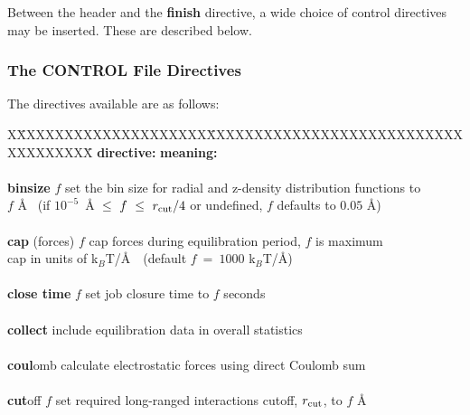 Between the header and the {\bf finish} directive, a wide choice
of control directives may be inserted.  These are described below.

\subsubsection{The CONTROL File Directives}

The directives available are as follows:

\begin{tabbing}
X\=XXXXXXXXXXXXXXXXXXXX\=XXXXXXXXXXXXXXXXXXXXXXXXXXXXXXXXXXXX\=\kill
\> {\bf directive:}                             \> {\bf meaning:} \\
\>                                              \> \\
\> {\bf binsize} $f$                            \> set the bin size for radial and z-density distribution functions to \\
\>                                              \> $f$ \AA~ (if $10^{-5}$~\AA~$\le~f~\le~r_{\rm cut}/4$ or undefined, $f$ defaults to $0.05$ \AA) \\
\>                                              \> \\
\> {\bf cap} (forces) $f$                       \> cap forces during equilibration period, $f$ is maximum \\
\>                                              \> cap in units of k$_{B}$T/\AA~~(default $f~=~1000$ k$_{B}$T/\AA) \\
\>                                              \> \\
\> {\bf close time} $f$                         \> set job closure time to $f$ seconds \\
\>                                              \> \\
\> {\bf collect}                                \> include equilibration data in overall statistics \\
\>                                              \> \\
\> {\bf coul}omb                                \> calculate electrostatic forces using direct Coulomb sum \\
\>                                              \> \\
\> {\bf cut}off $f$                             \> set required long-ranged interactions cutoff, $r_{\rm cut}$, to $f$ \AA~ \\

\end{tabbing}
